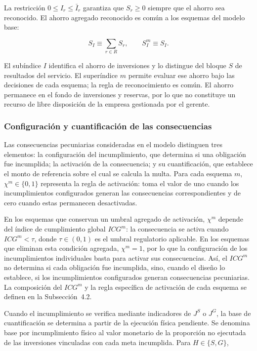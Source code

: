 La restricción \(0\leq I_r\leq\bar I_r\) garantiza que \(S_r\geq0\) siempre que el ahorro sea reconocido. El ahorro agregado reconocido es común a los esquemas del modelo base:

\begin{equation}
\label{eq:ahorro_agregado}
S_I
\equiv
\sum_{r\in R}S_r,
\qquad
S_I^m\equiv S_I.
\end{equation}

El subíndice \(I\) identifica el ahorro de inversiones y lo distingue del bloque \(S\) de resultados del servicio. El superíndice \(m\) permite evaluar ese ahorro bajo las decisiones de cada esquema; la regla de reconocimiento es común. El ahorro permanece en el fondo de inversiones y reservas, por lo que no constituye un recurso de libre disposición de la empresa gestionada por el gerente.

\subsubsection{Configuración y cuantificación de las consecuencias}

Las consecuencias pecuniarias consideradas en el modelo distinguen tres elementos: la configuración del incumplimiento, que determina si una obligación fue incumplida; la activación de la consecuencia; y su cuantificación, que establece el monto de referencia sobre el cual se calcula la multa. Para cada esquema \(m\), \(\chi^m\in\{0,1\}\) representa la regla de activación: toma el valor de uno cuando los incumplimientos configurados generan las consecuencias correspondientes y de cero cuando estas permanecen desactivadas.

En los esquemas que conservan un umbral agregado de activación, \(\chi^m\) depende del índice de cumplimiento global \(ICG^m\): la consecuencia se activa cuando \(ICG^m<\tau\), donde \(\tau\in(0,1)\) es el umbral regulatorio aplicable. En los esquemas que eliminan esta condición agregada, \(\chi^m=1\), por lo que la configuración de los incumplimientos individuales basta para activar sus consecuencias. Así, el \(ICG^m\) no determina si cada obligación fue incumplida, sino, cuando el diseño lo establece, si los incumplimientos configurados generan consecuencias pecuniarias. La composición del \(ICG^m\) y la regla específica de activación de cada esquema se definen en la Subsección~4.2.

Cuando el incumplimiento se verifica mediante indicadores de \(J^{S}\) o \(J^{G}\), la base de cuantificación se determina a partir de la ejecución física pendiente. Se denomina base por incumplimiento físico al valor monetario de la proporción no ejecutada de las inversiones vinculadas con cada meta incumplida. Para \(H\in\{S,G\}\),


